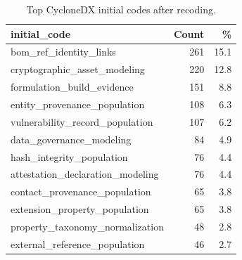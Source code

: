 \begin{table}[t]
\caption{Top CycloneDX initial codes after recoding.}
\label{tab:cdx-top-codes}
\centering
\small
\begin{tabularx}{\columnwidth}{@{}Xrr@{}}
\toprule
\textbf{initial\_code} & \textbf{Count} & \textbf{\%} \\
\midrule
bom\_ref\_identity\_links & 261 & 15.1 \\
cryptographic\_asset\_modeling & 220 & 12.8 \\
formulation\_build\_evidence & 151 & 8.8 \\
entity\_provenance\_population & 108 & 6.3 \\
vulnerability\_record\_population & 107 & 6.2 \\
data\_governance\_modeling & 84 & 4.9 \\
hash\_integrity\_population & 76 & 4.4 \\
attestation\_declaration\_modeling & 76 & 4.4 \\
contact\_provenance\_population & 65 & 3.8 \\
extension\_property\_population & 65 & 3.8 \\
property\_taxonomy\_normalization & 48 & 2.8 \\
external\_reference\_population & 46 & 2.7 \\
\bottomrule
\end{tabularx}
\end{table}
